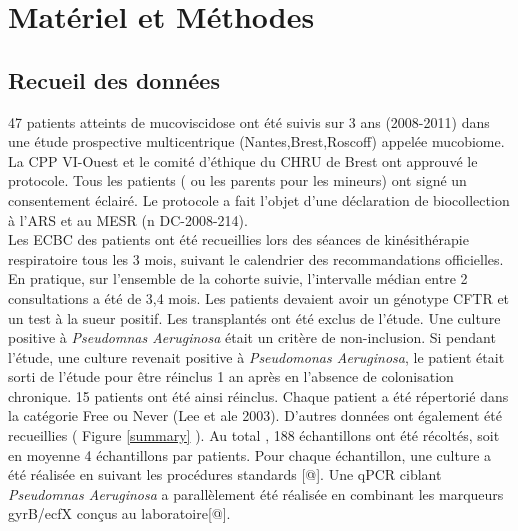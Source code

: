 \documentclass[12pt,a4paper]{article}
\begin{document}
\section{Matériel et Méthodes}
\subsection{Recueil des données}

47 patients atteints de mucoviscidose ont été suivis sur 3 ans (2008-2011) dans une étude prospective multicentrique (Nantes,Brest,Roscoff) appelée mucobiome.
La CPP VI-Ouest et le comité d’éthique du CHRU de Brest ont approuvé le protocole. Tous les patients ( ou les parents pour les mineurs) ont signé un consentement éclairé. Le protocole a fait l’objet d’une déclaration de biocollection à l’ARS et au MESR (n DC-2008-214).\\
Les ECBC des patients ont été recueillies lors des séances de kinésithérapie respiratoire tous les 3 mois, suivant le calendrier des recommandations officielles. En pratique, sur l’ensemble de la cohorte suivie, l’intervalle médian entre 2 consultations a été de 3,4 mois.
Les patients devaient avoir un génotype CFTR et un test à la sueur positif. Les transplantés ont été exclus de l’étude.
Une culture positive à \textit{Pseudomnas Aeruginosa} était un critère de non-inclusion. Si pendant l’étude, une culture revenait positive à \textit{Pseudomonas Aeruginosa}, le patient était sorti de l’étude pour être réinclus 1 an après en l’absence de colonisation chronique. 15 patients ont été ainsi réinclus.
Chaque patient a été répertorié dans la catégorie Free ou Never (Lee et ale 2003). D’autres données ont également été recueillies ( Figure \ref{summary} ).
Au total , 188 échantillons ont été récoltés, soit en moyenne 4 échantillons par patients.
Pour chaque échantillon, une culture a été réalisée en suivant les procédures standards [@]. Une qPCR ciblant \textit{Pseudomnas Aeruginosa} a parallèlement été réalisée en combinant les marqueurs gyrB/ecfX conçus au laboratoire[@].
\end{document}
